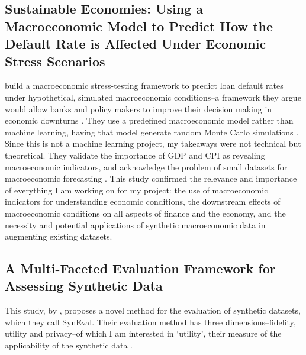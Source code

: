 \documentclass[10pt,twocolumn]{article}
\begin{document}
\subsection{Sustainable Economies: Using a Macroeconomic Model to Predict How the Default Rate is Affected Under Economic Stress Scenarios}
\textcite{baltazar2020sustainableeconomies} build a macroeconomic stress-testing framework to predict loan default rates under hypothetical, simulated macroeconomic conditions–a framework they argue would allow banks and policy makers to improve their decision making in economic downturns \textcite{baltazar2020sustainableeconomies}. They use a predefined macroeconomic model rather than machine learning, having that model generate random Monte Carlo simulations \textcite{baltazar2020sustainableeconomies}.\\
Since this is not a machine learning project, my takeaways were not technical but theoretical. They validate the importance of GDP and CPI as revealing macroeconomic indicators, and acknowledge the problem of small datasets for macroeconomic forecasting \textcite{baltazar2020sustainableeconomies}. This study confirmed the relevance and importance of everything I am working on for my project: the use of macroeconomic indicators for understanding economic conditions, the downstream effects of macroeconomic conditions on all aspects of finance and the economy, and the necessity and potential applications of synthetic macroeconomic data in augmenting existing datasets.

\subsection{A Multi-Faceted Evaluation Framework for Assessing Synthetic Data}
This study, by \textcite{yuan2024multifacetedevaluation}, proposes a novel method for the evaluation of synthetic datasets, which they call SynEval. Their evaluation method has three dimensions–fidelity, utility and privacy–of which I am interested in ‘utility’, their measure of the applicability of the synthetic data \cite{yuan2024multifacetedevaluation}.
\end{document}
